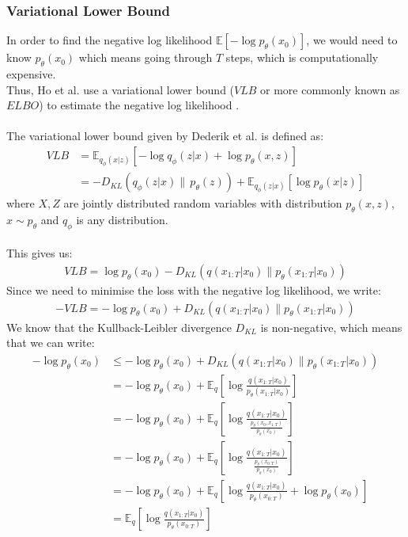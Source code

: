 \documentclass{article}
\begin{document}
\subsubsection{Variational Lower Bound}
In order to find the negative log likelihood $\mathbb{E}\left[- \log p_{\theta} \left(x_0\right)\right]$, we would need to know $p_{\theta} (x_0)$ which means going through $T$ steps, which is computationally expensive. \\
Thus, Ho et al. \cite{ho2020denoising} use a variational lower bound ($VLB$ or more commonly known as $ELBO$) to estimate the negative log likelihood \cite{ho2020denoising,sohldickstein2015deep}.
\\\\
The variational lower bound given by Dederik et al. is defined as: \cite{kingma2022autoencoding} 
\begin{align}
  VLB &= \mathbb{E}_{q_\phi (x | z)} \left[ - \log q_\phi (z | x) + \log p_\theta(x, z) \right] \\[10pt]
  &= - D_{KL} (q_\phi (z | x) \| \, p_\theta (z)) + \mathbb{E}_{q_\phi (z | x)} \left[ \log p_\theta (x | z) \right]
\end{align}
where $X, Z$ are jointly distributed random variables with distribution $p_\theta (x, z)$, $x \sim p_\theta$ and $q_\phi$ is any distribution.
\\\\
This gives us:
\begin{gather}
  VLB = \log p_{\theta}\left(x_0\right) - D_{KL}\left(q\left(x_{1:T}|x_0\right) \| p_{\theta}\left(x_{1:T}|x_0\right)\right)
\end{gather}
Since we need to minimise the loss with the negative log likelihood, we write:
\begin{gather}
  - VLB = - \log p_{\theta}\left(x_0\right) + D_{KL}\left(q\left(x_{1:T}|x_0\right) \| p_{\theta}\left(x_{1:T}|x_0\right)\right)
\end{gather}
We know that the Kullback-Leibler divergence $D_{KL}$ is non-negative, which means that we can write:
\begin{align}
  - \log p_{\theta}\left(x_0\right) &\leq - \log p_{\theta}\left(x_0\right) + D_{KL}\left(q\left(x_{1:T}|x_0\right) \| p_{\theta}\left(x_{1:T}|x_0\right)\right) \\[10pt]
  &= - \log p_{\theta}\left(x_0\right) + \mathbb{E}_q \left[\log \frac{q\left(x_{1:T}|x_0\right)}{p_{\theta}\left(x_{1:T}|x_0\right)}\right] \\[10pt]
  &= - \log p_{\theta}\left(x_0\right) + \mathbb{E}_q \left[\log \frac{q\left(x_{1:T}|x_0\right)}{\frac{p_{\theta}\left(x_0, x_{1:T}\right)}{p_{\theta}\left(x_0\right)}}\right] \\[10pt]
  &= - \log p_{\theta}\left(x_0\right) + \mathbb{E}_q \left[\log \frac{q\left(x_{1:T}|x_0\right)}{\frac{p_{\theta}\left(x_{0:T}\right)}{p_{\theta}\left(x_0\right)}}\right] \\[10pt]
  &= - \log p_{\theta}\left(x_0\right) + \mathbb{E}_q \left[\log \frac{q\left(x_{1:T}|x_0\right)}{p_{\theta}\left(x_{0:T}\right)} + \log {p_{\theta}\left(x_0\right)}\right] \\[10pt]
  &= \mathbb{E}_q \left[\log \frac{q\left(x_{1:T}|x_0\right)}{p_{\theta}\left(x_{0:T}\right)}\right]
\end{align}
\end{document}
